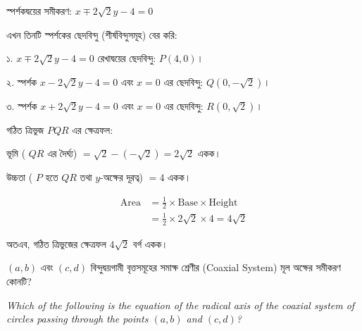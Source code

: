 \documentclass[12pt, a4paper]{article}
\begin{document}
\begin{tcolorbox}[solutionbox={সমাধান (Solution)}]
    \vspace{0.5em}
    স্পর্শকদ্বয়ের সমীকরণ: $x \mp 2\sqrt{2}y - 4 = 0$
    
    \vspace{0.5em}
    এখন তিনটি স্পর্শকের ছেদবিন্দু (শীর্ষবিন্দুসমূহ) বের করি:
    
    \vspace{0.5em}
    ১. $x \mp 2\sqrt{2}y - 4 = 0$ রেখাদ্বয়ের ছেদবিন্দু: $P(4, 0)$।
    
    \vspace{0.5em}
    ২. স্পর্শক $x - 2\sqrt{2}y - 4 = 0$ এবং $x = 0$ এর ছেদবিন্দু: $Q(0, -\sqrt{2})$।
    
    \vspace{0.5em}
    ৩. স্পর্শক $x + 2\sqrt{2}y - 4 = 0$ এবং $x = 0$ এর ছেদবিন্দু: $R(0, \sqrt{2})$।
    
    \vspace{0.5em}
    গঠিত ত্রিভুজ $PQR$ এর ক্ষেত্রফল:
    
    \vspace{0.5em}
    ভূমি ( $QR$ এর দৈর্ঘ্য) $= \sqrt{2} - (-\sqrt{2}) = 2\sqrt{2}$ একক।
    
    \vspace{0.5em}
    উচ্চতা ( $P$ হতে $QR$ তথা $y$-অক্ষের দূরত্ব) $= 4$ একক।
    
    \vspace{0.5em}
    \begin{align*}
        \text{Area} &= \frac{1}{2} \times \text{Base} \times \text{Height} \\
        &= \frac{1}{2} \times 2\sqrt{2} \times 4 = 4\sqrt{2}
    \end{align*}
    
    \vspace{0.5em}
    অতএব, গঠিত ত্রিভুজের ক্ষেত্রফল $4\sqrt{2}$ বর্গ একক।
\end{tcolorbox}

\begin{tcolorbox}[questionbox={প্রশ্ন (Question) 32}]
    \noindent
    $(a, b)$ এবং $(c, d)$ বিন্দুদ্বয়গামী বৃত্তসমূহের সমাক্ষ শ্রেণীর (Coaxial System) মূল অক্ষের সমীকরণ কোনটি?
    
    \vspace{0.8em}
    \begin{english}
    \noindent\textit{\color{darkgray}
    Which of the following is the equation of the radical axis of the coaxial system of circles passing through the points $(a, b)$ and $(c, d)$?
    }
    \end{english}
\end{tcolorbox}
\end{document}
